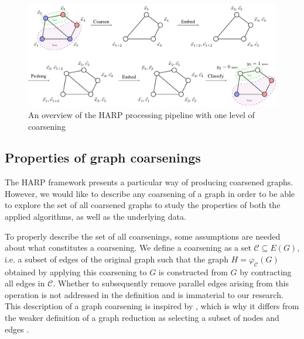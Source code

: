 \documentclass[sn-mathphys,pdflatex,iicol]{sn-jnl}%
\begin{document}
\begin{figure}
  \centering
  \includegraphics[width=\textwidth]{images/harp-overview/harp-overview.pdf}
  \caption{An overview of the HARP processing pipeline with one level of coarsening}
  \label{fig:harp-overview}
\end{figure}

\subsection{Properties of graph coarsenings}\label{sec:coarsening-properties}

The HARP framework presents a particular way of producing coarsened graphs. However, we would like to describe any coarsening of a graph in order to be able to explore the set of all coarsened graphs to study the properties of both the applied algorithms, as well as the underlying data.

To properly describe the set of all coarsenings, some assumptions are needed about what constitutes a coarsening. We define a coarsening as a set \( \mathcal{C} \subseteq E \left( G \right) \), i.e. a subset of edges of the original graph such that the graph \( H = \varphi_\mathcal{C} \left( G \right) \) obtained by applying this coarsening to \( G \) is constructed from \( G \) by contracting all edges in \( \mathcal{C} \). Whether to subsequently remove parallel edges arising from this operation is not addressed in the definition and is immaterial to our research. This description of a graph coarsening is inspired by \cite{schulz_mining_2019}, which is why it differs from the weaker definition of a graph reduction as selecting a subset of nodes and edges \cite{huang_scaling_2021, loukas_graph_2019}.
\end{document}

